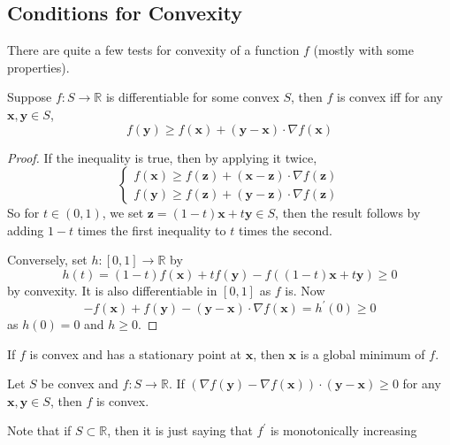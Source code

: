 \documentclass{article}
\begin{document}
\subsection{Conditions for Convexity}
There are quite a few tests for convexity of a function $f$ (mostly with some properties).
\begin{proposition}
    Suppose $f:S\to\mathbb R$ is differentiable for some convex $S$, then $f$ is convex iff for any $\mathbf{x},\mathbf{y}\in S$,
    $$f(\mathbf{y})\ge f(\mathbf{x})+(\mathbf{y}-\mathbf{x})\cdot\nabla f(\mathbf{x})$$
\end{proposition}
\begin{proof}
    If the inequality is true, then by applying it twice,
    $$\begin{cases}
        f(\mathbf{x})\ge f(\mathbf{z})+(\mathbf{x}-\mathbf{z})\cdot\nabla f(\mathbf{z})\\
        f(\mathbf{y})\ge f(\mathbf{z})+(\mathbf{y}-\mathbf{z})\cdot\nabla f(\mathbf{z})
    \end{cases}$$
    So for $t\in (0,1)$, we set $\mathbf{z}=(1-t)\mathbf{x}+t\mathbf{y}\in S$, then the result follows by adding $1-t$ times the first inequality to $t$ times the second.

    Conversely, set $h:[0,1]\to\mathbb R$ by
    $$h(t)=(1-t)f(\mathbf{x})+tf(\mathbf{y})-f((1-t)\mathbf{x}+t\mathbf{y})\ge 0$$
    by convexity.
    It is also differentiable in $[0,1]$ as $f$ is.
    Now
    $$-f(\mathbf{x})+f(\mathbf{y})-(\mathbf{y}-\mathbf{x})\cdot\nabla f(\mathbf{x})=h^\prime(0)\ge 0$$
    as $h(0)=0$ and $h\ge 0$.
\end{proof}
\begin{corollary}
    If $f$ is convex and has a stationary point at $\mathbf{x}$, then $\mathbf{x}$ is a global minimum of $f$.
\end{corollary}

\begin{proposition}
    Let $S$ be convex and $f:S\to\mathbb R$.
    If $(\nabla f(\mathbf{y})-\nabla f(\mathbf{x}))\cdot (\mathbf{y}-\mathbf{x})\ge 0$ for any $\mathbf{x},\mathbf{y}\in S$, then $f$ is convex.
\end{proposition}
Note that if $S\subset\mathbb R$, then it is just saying that $f^\prime$ is monotonically increasing
\end{document}
